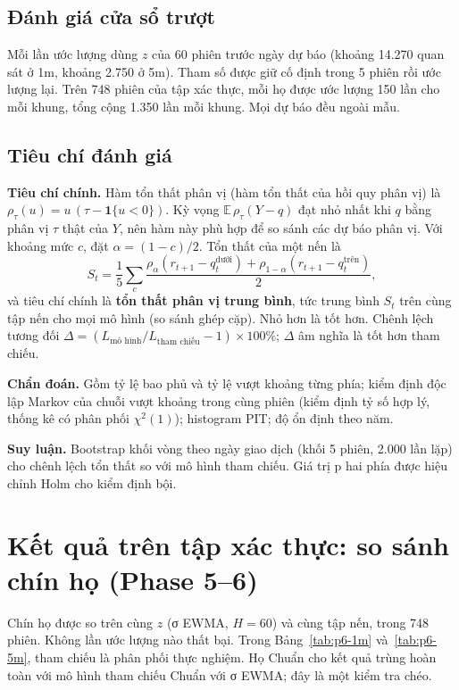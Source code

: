\documentclass[11pt,a4paper]{article}
\begin{document}
\subsection{Đánh giá cửa sổ trượt}

Mỗi lần ước lượng dùng $z$ của 60 phiên trước ngày dự báo (khoảng 14.270 quan sát ở 1m, khoảng 2.750 ở 5m). Tham số được giữ cố định trong 5 phiên rồi ước lượng lại. Trên 748 phiên của tập xác thực, mỗi họ được ước lượng 150 lần cho mỗi khung, tổng cộng 1.350 lần mỗi khung. Mọi dự báo đều ngoài mẫu.

\subsection{Tiêu chí đánh giá}

\textbf{Tiêu chí chính.} Hàm tổn thất phân vị (hàm tổn thất của hồi quy phân vị) là $\rho_\tau(u)=u\,(\tau-\mathbf 1\{u<0\})$. Kỳ vọng $\mathbb E\,\rho_\tau(Y-q)$ đạt nhỏ nhất khi $q$ bằng phân vị $\tau$ thật của $Y$, nên hàm này phù hợp để so sánh các dự báo phân vị. Với khoảng mức $c$, đặt $\alpha=(1-c)/2$. Tổn thất của một nến là
\begin{equation}
S_t = \frac{1}{5}\sum_{c}\frac{\rho_{\alpha}(r_{t+1}-q^{\text{dưới}}_t)+\rho_{1-\alpha}(r_{t+1}-q^{\text{trên}}_t)}{2},
\end{equation}
và tiêu chí chính là \textbf{tổn thất phân vị trung bình}, tức trung bình $S_t$ trên cùng tập nến cho mọi mô hình (so sánh ghép cặp). Nhỏ hơn là tốt hơn. Chênh lệch tương đối $\Delta=(L_\text{mô hình}/L_\text{tham chiếu}-1)\times100\%$; $\Delta$ âm nghĩa là tốt hơn tham chiếu.

\textbf{Chẩn đoán.} Gồm tỷ lệ bao phủ và tỷ lệ vượt khoảng từng phía; kiểm định độc lập Markov của chuỗi vượt khoảng trong cùng phiên (kiểm định tỷ số hợp lý, thống kê có phân phối $\chi^2(1)$); histogram PIT; độ ổn định theo năm.

\textbf{Suy luận.} Bootstrap khối vòng theo ngày giao dịch (khối 5 phiên, 2.000 lần lặp) cho chênh lệch tổn thất so với mô hình tham chiếu. Giá trị p hai phía được hiệu chỉnh Holm cho kiểm định bội.

\section{Kết quả trên tập xác thực: so sánh chín họ (Phase 5--6)}

Chín họ được so trên cùng $z$ (σ EWMA, $H=60$) và cùng tập nến, trong 748 phiên. Không lần ước lượng nào thất bại. Trong Bảng~\ref{tab:p6-1m} và~\ref{tab:p6-5m}, tham chiếu là phân phối thực nghiệm. Họ Chuẩn cho kết quả trùng hoàn toàn với mô hình tham chiếu Chuẩn với σ EWMA; đây là một kiểm tra chéo.
\end{document}
